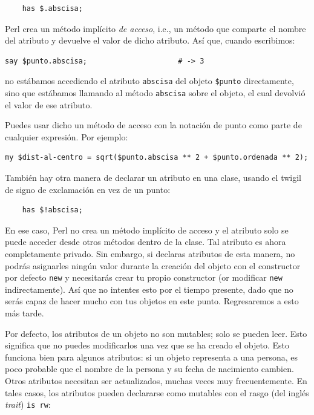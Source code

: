 \begin{lstlisting}
    has $.abscisa;  
\end{lstlisting}
%
Perl crea un método implícito \emph{de acceso}, i.e., un método
que comparte el nombre del atributo y devuelve el valor de dicho
atributo. Así que, cuando escribimos:

\begin{lstlisting}
say $punto.abscisa;                     # -> 3
\end{lstlisting}
%
no estábamos accediendo el atributo {\tt abscisa} del objeto
\verb|$punto| directamente, sino que estábamos llamando al método
{\tt abscisa} sobre el objeto, el cual devolvió el valor de ese
atributo.


Puedes usar dicho un método de acceso con la notación de punto
como parte de cualquier expresión. Por ejemplo:

\begin{lstlisting}
my $dist-al-centro = sqrt($punto.abscisa ** 2 + $punto.ordenada ** 2);
\end{lstlisting}
%

También hay otra manera de declarar un atributo en una clase, 
usando el twigil de signo de exclamación en vez de un punto:

\begin{lstlisting}
    has $!abscisa;  
\end{lstlisting}
%
En ese caso, Perl no crea un método implícito de acceso 
y el atributo solo se puede acceder desde otros métodos
dentro de la clase. Tal atributo es ahora completamente privado. 
Sin embargo, si declaras atributos de esta manera, no podrás
asignarles ningún valor durante la creación del objeto con el 
constructor por defecto {\tt new} y necesitarás crear tu propio
constructor (or modificar {\tt new} indirectamente). Así que no
intentes esto por el tiempo presente, dado que no serás capaz
de hacer mucho con tus objetos en este punto. Regresaremos a esto 
más tarde.

Por defecto, los atributos de un objeto no son mutables; solo
se pueden leer. Esto significa que no puedes modificarlos una vez que 
se ha creado el objeto. Esto funciona bien para algunos atributos: si
un objeto representa a una persona, es poco probable que el nombre 
de la persona y su fecha de nacimiento cambien. Otros atributos necesitan
ser actualizados, muchas veces muy frecuentemente. En tales casos, los
atributos pueden declararse como mutables con el rasgo (del inglés \emph{trait})
 {\tt is rw}:

